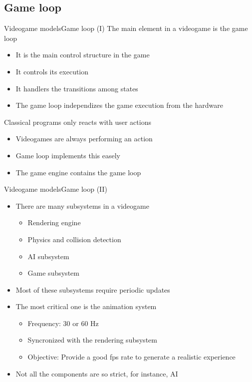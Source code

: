 \documentclass[10pt,compress]{beamer} %
\begin{document}
\subsection{Game loop}
\begin{frame}{Videogame models}{Game loop (I)}
	   	The main element in a videogame is the \alert{game loop}
		\begin{itemize}
			\item It is the main control structure in the game
			\item It controls its execution
			\item It handlers the transitions among states
			\item The game loop independizes the game execution from the hardware
		\end{itemize}
		Classical programs only reacts with user actions
		\begin{itemize}
			\item Videogames are always performing an action
			\item Game loop implements this easely
			\item The game engine contains the game loop
		\end{itemize}
\end{frame}

\begin{frame}{Videogame models}{Game loop (II)}
		\begin{itemize}
		   	\item There are many subsystems in a videogame
			\begin{itemize}
				\item Rendering engine
				\item Physics and collision detection
				\item AI subsystem
				\item Game subsystem
			\end{itemize}
			\item Most of these subsystems require periodic updates
			\item The most critical one is the animation system
			\begin{itemize}
				\item Frequency: 30 or 60 Hz
				\item Syncronized with the rendering subsystem
				\item Objective: Provide a good fps rate to generate a realistic experience
			\end{itemize}
			\item Not all the components are so strict, for instance, AI
		\end{itemize}
\end{frame}
\end{document}
